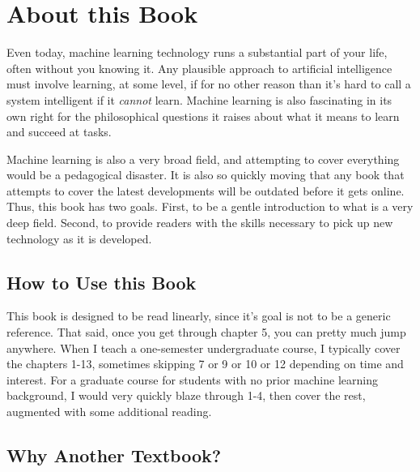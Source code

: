 
\chapter{About this Book} \label{sec:intro}

Even today, machine learning technology runs a substantial part of your life, often without you knowing it.
Any plausible approach to artificial intelligence must involve learning, at some level, if for no other reason than it's hard to call a system intelligent if it \emph{cannot} learn.
Machine learning is also fascinating in its own right for the philosophical questions it raises about what it means to learn and succeed at tasks.

Machine learning is also a very broad field, and attempting to cover everything would be a pedagogical disaster.
It is also so quickly moving that any book that attempts to cover the latest developments will be outdated before it gets online.
Thus, this book has two goals.
First, to be a gentle introduction to what is a very deep field.
Second, to provide readers with the skills necessary to pick up new technology as it is developed.

\section{How to Use this Book}

This book is designed to be read linearly, since it's goal is not to be a generic reference.
That said, once you get through chapter 5, you can pretty much jump anywhere.
When I teach a one-semester undergraduate course, I typically cover the chapters 1-13, sometimes skipping 7 or 9 or 10 or 12 depending on time and interest.
For a graduate course for students with no prior machine learning background, I would very quickly blaze through 1-4, then cover the rest, augmented with some additional reading.


\section{Why Another Textbook?}

